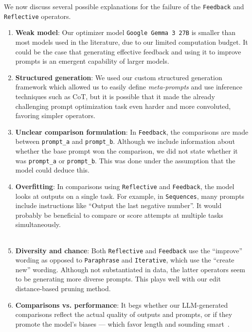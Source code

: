 We now discuss several possible explanations for the failure of the \texttt{Feedback} and \texttt{Reflective} operators.
\newpage
\begin{enumerate}
    \item \textbf{Weak model}: Our optimizer model \texttt{Google Gemma 3 27B} is smaller than most models used in the literature, due to our limited computation budget. It could be the case that generating effective feedback and using it to improve prompts is an emergent capability of larger models.
    \item \textbf{Structured generation}: We used our custom structured generation framework which allowed us to easily define \textit{meta-prompts} and use inference techniques such as CoT, but it is possible that it made the already challenging prompt optimization task even harder and more convoluted, favoring simpler operators.
    \item \textbf{Unclear comparison formulation}: In \texttt{Feedback}, the comparisons are made between \texttt{prompt\_a} and \texttt{prompt\_b}. Although we include information about whether the base prompt won the comparison, we did not state whether it was \texttt{prompt\_a} or \texttt{prompt\_b}. This was done under the assumption that the model could deduce this.
    \item \textbf{Overfitting}: In comparisons using \texttt{Reflective} and \texttt{Feedback}, the model looks at outputs on a single task. For example, in \texttt{Sequences}, many prompts include instructions like ``Output the last negative number''. It would probably be beneficial to compare or score attempts at multiple tasks simultaneously. \\\\
    \item \textbf{Diversity and chance}: Both \texttt{Reflective} and \texttt{Feedback} use the ``improve'' wording as opposed to \texttt{Paraphrase} and \texttt{Iterative}, which use the ``create new'' wording. Although not substantiated in data, the latter operators seem to be generating more diverse prompts. This plays well with our edit distance-based pruning method.
    \item \textbf{Comparisons vs. performance}: It begs whether our LLM-generated comparisons reflect the actual quality of outputs and prompts, or if they promote the model's biases — which favor length and sounding smart~\cite{ye2024justiceprejudicequantifyingbiases}.
\end{enumerate}

